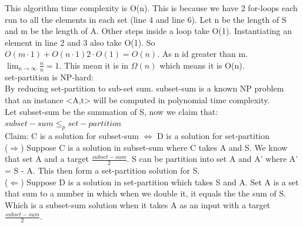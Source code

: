 \documentclass[a4paper, 11pt]{article}
\begin{document}
This algorithm time complexity is O(n). This is because we have 2 for-loops each run to all the elements in each set (line 4 and line 6). Let n be the length of S and m be the length of A. Other steps inside a loop take O(1). Instantiating an element in line 2 and 3 also take O(1). So $O(m \cdot 1) + O(n\cdot 1) 2 \cdot O(1) = O(n)$. As n id greater than m. $\lim_{n \to \infty} \frac{n}{n} = 1$. This mean it is in $\Omega(n)$ which means it is O(n).\\
set-partition is NP-hard:\\
By reducing set-partition to sub-set sum. subset-sum is a known NP problem that an instance <A,t> will be computed in polynomial time complexity.\\
Let subset-sum be the summation of S, now we claim that:\\
$subset-sum \leq_{p} set-partition$\\
Claim: C is a solution for subset-sum $\iff $  D is a solution for set-partition\\
($\Rightarrow$) Suppose C is a solution in subset-sum where C takes A and S. We know that set A and a target $\frac{subset-sum}{2}$. S can be partition into set A and A' where A' = S - A. This then form a set-partition solution for S.\\
($\Leftarrow$) Suppose D is a solution in set-partition which takes S and A. Set A is a set that sum to a number in which when we double it, it equals the the sum of S. Which is a subset-sum solution when it takes A as an input with a target $\frac{subset-sum}{2}$.
\end{document}
